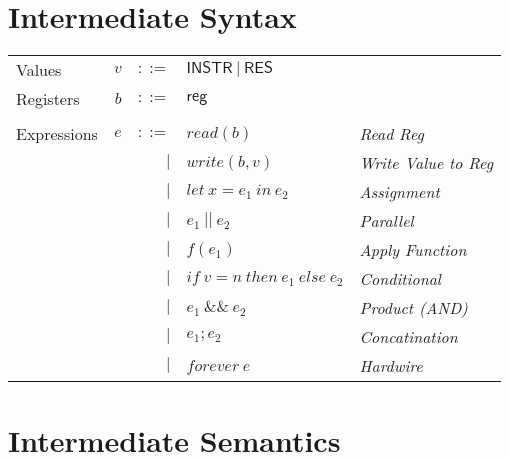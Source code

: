 \documentclass[12pt, letterpaper]{article}
\begin{document}
  \cleardoublepage
  \section{Intermediate Syntax}\label{sec:isyn}

    \begin{tabular}{l r r l l}
      Values        & $v$     & $::=$     & $\mathsf{INSTR\ |\ RES}$ &\\
      Registers     & $b$     & $::=$     & $\mathsf{reg}$           &\\
      \\
      Expressions & $e$ & $::=$  & $read(b)$       
                        & \textit{Read Reg}\\
                  &     & $\mid$ & $write(b,v)$    
                        & \textit{Write Value to Reg}\\
                  &     & $\mid$ & $let\ x = e_1\ in\ e_2$ 
                        & \textit{Assignment}\\  
                  &     & $\mid$ & $e_1\ ||\ e_2$ 
                        & \textit{Parallel}\\
                  &     & $\mid$ & $f(e_1)$        
                        & \textit{Apply Function} \\  
                  &     & $\mid$ & $if\ v = n\ then\ e_1\ else\ e_2$
                        & \textit{Conditional} \\
                  &     & $\mid$ & $e_1\ \&\&\ e_2$ 
                        & \textit{Product (AND)}\\
                  &     & $\mid$ & $e_1 ; e_2$
                        & \textit{Concatination}\\
                  &     & $\mid$ & $forever\ e$ 
                        & \textit{Hardwire}
    \end{tabular}


  \clearpage
  \section{Intermediate Semantics}\label{sec:icomp}
    
\end{document}
